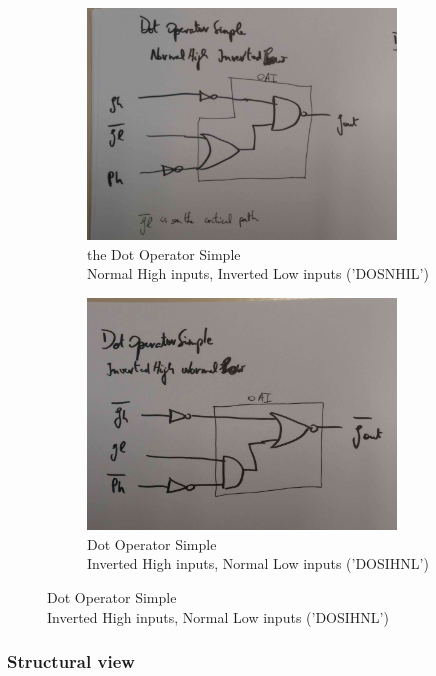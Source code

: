 \documentclass[english]{article}
\begin{document}
\begin{figure}[h!]
\centering
\begin{subfigure}{.5\textwidth}
  \centering
\includegraphics[width=0.9\textwidth]{figures/dosnhil}
\caption{the Dot Operator Simple \\Normal High inputs, Inverted Low inputs ('DOSNHIL')}
\label{DONHIL}
\end{subfigure}%
\begin{subfigure}{.5\textwidth}
  \centering
\includegraphics[width=0.9\textwidth]{figures/dosihnl}
\caption{Dot Operator Simple \\Inverted High inputs, Normal Low inputs ('DOSIHNL')}
\label{DONIHNL}
\end{subfigure}
\end{figure}

\subsubsection{Structural view}
\end{document}
